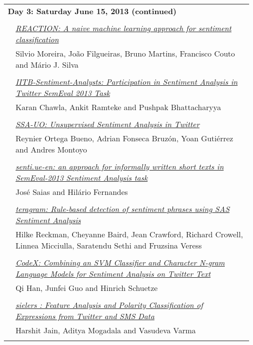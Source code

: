 \begin{tabular}{p{20mm}p{138mm}}
\\
\multicolumn{2}{l}{\bf Day 3: Saturday June 15, 2013 (continued)} \\\\
 & \hyperlink{page.490}{\em REACTION: A naive machine learning approach for sentiment classification}\\
         & Silvio Moreira, Jo\~{a}o Filgueiras, Bruno Martins, Francisco Couto and M\'{a}rio J. Silva \\
\\

 & \hyperlink{page.495}{\em IITB-Sentiment-Analysts: Participation in Sentiment Analysis in Twitter SemEval 2013 Task}\\
         & Karan Chawla, Ankit Ramteke and Pushpak Bhattacharyya \\
\\
 & \hyperlink{page.501}{\em SSA-UO: Unsupervised Sentiment Analysis in Twitter}\\
         & Reynier Ortega Bueno, Adrian Fonseca Bruz\'{o}n, Yoan Guti\'{e}rrez and Andres Montoyo \\
\\

 & \hyperlink{page.508}{\em senti.ue-en: an approach for informally written short texts in SemEval-2013 Sentiment Analysis task}\\
         & Jos\'{e} Saias and Hil\'{a}rio Fernandes \\
\\

 & \hyperlink{page.513}{\em teragram: Rule-based detection of sentiment phrases using SAS Sentiment Analysis}\\
         & Hilke Reckman, Cheyanne Baird, Jean Crawford, Richard Crowell, Linnea Micciulla, Saratendu Sethi and Fruzsina Veress \\
\\

 & \hyperlink{page.520}{\em CodeX: Combining an SVM Classifier and Character N-gram Language Models for Sentiment Analysis on Twitter Text}\\
         & Qi Han, Junfei Guo and Hinrich Schuetze \\
\\

 & \hyperlink{page.525}{\em sielers : Feature Analysis and Polarity Classification of Expressions from Twitter and SMS Data}\\
         & Harshit Jain, Aditya Mogadala and Vasudeva Varma \\
\\


\end{tabular}
